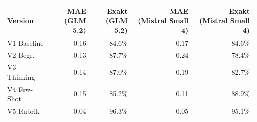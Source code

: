 \begin{tabular}{lrrrr}
\toprule
Version & \makecell{MAE\\(GLM 5.2)} & \makecell{Exakt\\(GLM 5.2)} & \makecell{MAE\\(Mistral Small 4)} & \makecell{Exakt\\(Mistral Small 4)} \\
\midrule
V1 Baseline & 0.16 & 84.6\% & 0.17 & 84.6\% \\
V2 Begr. & 0.13 & 87.7\% & 0.24 & 78.4\% \\
V3 Thinking & 0.14 & 87.0\% & 0.19 & 82.7\% \\
V4 Few-Shot & 0.15 & 85.2\% & 0.11 & 88.9\% \\
V5 Rubrik & 0.04 & 96.3\% & 0.05 & 95.1\% \\
\bottomrule
\end{tabular}